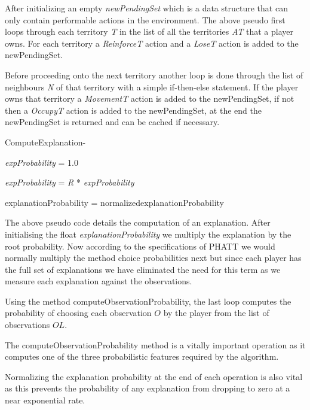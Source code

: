 \documentclass[parskip]{cs4rep}
\begin{document}
After initializing an empty \textit{newPendingSet} which is a data structure that can only contain performable actions in the environment. The above pseudo first loops through each territory \textit{T} in the list of all the territories \textit{AT} that a player owns. For each territory a \textit{ReinforceT} action and a \textit{LoseT} action is added to the newPendingSet. 

Before proceeding onto the next territory another loop is done through the list of neighbours \textit{N} of that territory with a simple if-then-else statement. If the player owns that territory a \textit{MovementT} action is added to the newPendingSet, if not then a \textit{OccupyT} action is added to the newPendingSet, at the end the newPendingSet is returned and can be cached if necessary.

\begin{pseudocode}[ruled]{ComputeExplanation}{-}
\begin{algorithm}[H]

\textit{expProbability} = 1.0

\textit{expProbability} = \textit{R} * \textit{expProbability}	


explanationProbability = normalized{explanationProbability}

\end{algorithm}
\end{pseudocode}

The above pseudo code details the computation of an explanation. After initialising the float \textit{explanationProbability} we multiply the explanation by the root probability. Now according to the specifications of PHATT we would normally multiply the method choice probabilities next but since each player has the full set of explanations we have eliminated the need for this term as we measure each explanation against the observations.

Using the method computeObservationProbability, the last loop computes the probability of choosing each observation $O$ by the player from the list of observations $OL$.

The computeObservationProbability method is a vitally important operation as it computes one of the three probabilistic features required by the algorithm.

Normalizing the explanation probability at the end of each operation is also vital as this prevents the probability of any explanation from dropping to zero at a near exponential rate. 
\end{document}
